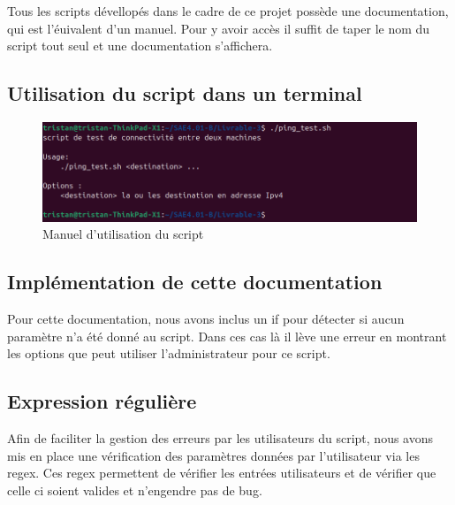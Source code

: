 \documentclass[../file_doc_script.tex]{subfiles}
\begin{document}
Tous les scripts dévellopés dans le cadre de ce projet possède une documentation,
qui est l'éuivalent d'un manuel. Pour y avoir accès il suffit de taper le nom du script
tout seul et une documentation s'affichera.

\subsection{Utilisation du script dans un terminal}

\begin{figure}[h]
    \centering
    \includegraphics[width=1\textwidth]{../Images/doc-script-terminal.png}
    \caption{Manuel d'utilisation du script}
    \label{fig:solution1}
\end{figure}

\subsection{Implémentation de cette documentation}
Pour cette documentation, nous avons inclus un if pour détecter si aucun paramètre n'a été 
donné au script. Dans ces cas là il lève une erreur en montrant les options que peut utiliser 
l'administrateur pour ce script.



\subsection{Expression régulière}
Afin de faciliter la gestion des erreurs par les utilisateurs du script, nous avons 
mis en place une vérification des paramètres données par l'utilisateur via les regex.
Ces regex permettent de vérifier les entrées utilisateurs et de vérifier que celle ci soient 
valides et n'engendre pas de bug.


\end{document}

